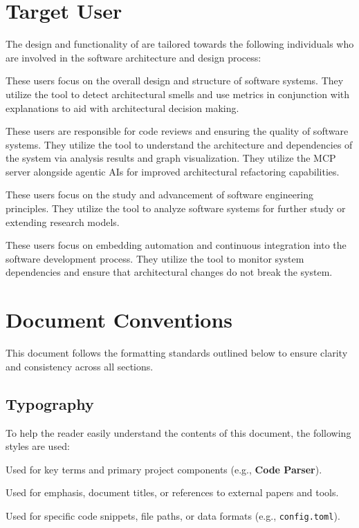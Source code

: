 \section{Target User}
\label{section:target-user}

The design and functionality of \textbf{\usevar{\srsNickName}} are tailored towards the following individuals who are involved in the software architecture and design process:

\begin{description}[style=multiline, leftmargin=3.5cm, font=\normalfont]
    \item[\textbf{Software Architects:}] These users focus on the overall design and structure of software systems. They utilize the tool to detect architectural smells and use metrics in conjunction with explanations to aid with architectural decision making.
    \item[\textbf{Lead Developers and Tech Leads:}] These users are responsible for code reviews and ensuring the quality of software systems. They utilize the tool to understand the architecture and dependencies of the system via analysis results and graph visualization. They utilize the MCP server alongside agentic AIs for improved architectural refactoring capabilities.
    \item[\textbf{Software Engineering Researchers and Students:}] These users focus on the study and advancement of software engineering principles. They utilize the tool to analyze software systems for further study or extending research models.
    \item[\textbf{DevOps:}] These users focus on embedding automation and continuous integration into the software development process. They utilize the tool to monitor system dependencies and ensure that architectural changes do not break the system.
\end{description}

\section{Document Conventions}
\label{section:doc-conventions}

This document follows the formatting standards outlined below to ensure clarity and consistency across all sections.

\subsection{Typography}
To help the reader easily understand the contents of this document, the following styles are used:
\begin{description}[style=multiline, leftmargin=3cm, font=\normalfont]
    \item[\textbf{Bold Text:}] Used for key terms and primary project components (e.g., \textbf{Code Parser}).
    \item[\textit{Italic Text:}] Used for emphasis, document titles, or references to external papers and tools.
    \item[\texttt{Monospaced Font:}] Used for specific code snippets, file paths, or data formats (e.g., \texttt{config.toml}).
\end{description}

